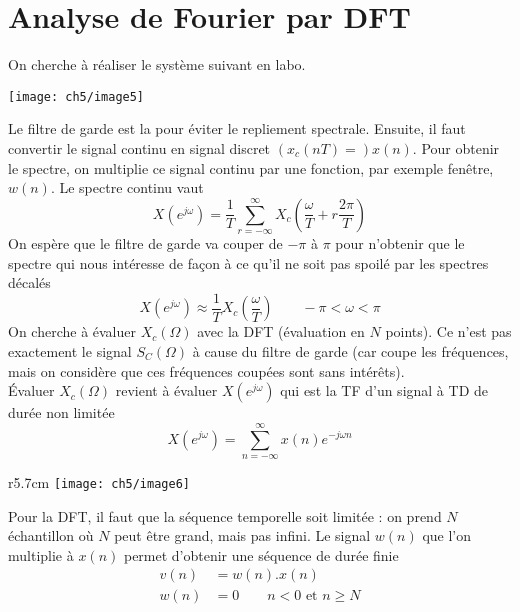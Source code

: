 		
	
	
	\newpage
	\section{Analyse de Fourier par DFT}
	On cherche à réaliser le système suivant en labo.
	\begin{center}
	\texttt{[image: ch5/image5]}
	\end{center}
	Le filtre de garde est la pour éviter le repliement spectrale. Ensuite, il faut convertir le signal 
	continu en signal discret $(x_c(nT)=)x(n)$. Pour obtenir le spectre, on multiplie ce signal continu par une 
	fonction, par exemple fenêtre, $w(n)$.  Le spectre continu vaut
	\begin{equation}
	X(e^{j\omega}) = \frac{1}{T}\sum_{r=-\infty}^\infty X_c\left(\frac{\omega}{T}+r\frac{2\pi}{T}\right)
	\end{equation}
	On espère que le filtre de garde va couper de $-\pi$ à $\pi$ pour n'obtenir que le spectre qui 
	nous intéresse de façon à ce qu'il ne soit pas spoilé par les spectres décalés
	\begin{equation}
	X(e^{j\omega})\approx \frac{1}{T}X_c\left(\frac{\omega}{T}\right)\qquad -\pi<\omega<\pi
	\end{equation}
	On cherche à évaluer $X_c(\Omega)$ avec la DFT (évaluation en $N$ points). Ce n'est pas exactement 
	le signal $S_C(\Omega)$ à cause du filtre de garde (car coupe les fréquences, mais on considère que 
	ces fréquences coupées sont sans intérêts).\\
	
	Évaluer $X_c(\Omega)$ revient à évaluer $X(e^{j\omega})$ qui est la TF d'un signal à TD de durée
	non limitée
	\begin{equation}
	X(e^{j\omega}) = \sum_{n=-\infty}^\infty x(n)e^{-j\omega n}
	\end{equation}
	
	\begin{wrapfigure}[17]{r}{5.7cm}
	\vspace{-5mm}
	\texttt{[image: ch5/image6]}
	\end{wrapfigure}	
	Pour la DFT, il faut que la séquence temporelle soit limitée : on prend $N$ échantillon où $N$ 
	peut être grand, mais pas infini. Le signal $w(n)$ que l'on multiplie à $x(n)$ permet 
	d'obtenir une séquence de durée finie
	\begin{equation}
	\begin{array}{ll}
	v(n) &= w(n).x(n)\\
	w(n) &=0\qquad n<0\text{ et } n\geq N
	\end{array}
	\end{equation}
	
